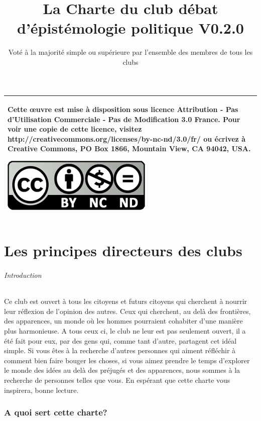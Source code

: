 \documentclass[a4paper,12pt]{article}
\title{\Huge{La Charte du club débat d'épistémologie politique} \LARGE{V0.2.0}}
\author{Voté à la majorité simple ou supérieure par l'ensemble des membres de tous les clubs}
\begin{document}
\maketitle

\begin{tabular}{|p{}|}
 \hline
 Cette œuvre est mise à disposition sous licence Attribution - Pas d’Utilisation Commerciale - Pas de Modification 3.0 France. Pour voir une copie de cette licence, visitez http://creativecommons.org/licenses/by-nc-nd/3.0/fr/ ou écrivez à Creative Commons, PO Box 1866, Mountain View, CA 94042, USA.
 \begin{center}
 \includegraphics[scale=1]{cc.jpg}
 \end{center}\\
 \hline
\end{tabular}
\tableofcontents
\newpage

\part{Les principes directeurs des clubs}
\paragraph{Introduction}
Ce club est ouvert à tous les citoyens et futurs citoyens qui cherchent à nourrir leur réflexion de l'opinion des autres. Ceux qui cherchent, au delà des frontières, des apparences, un monde où les hommes pourraient cohabiter d'une manière plus harmonieuse. A tous ceux ci, le club ne leur est pas seulement ouvert, il a été fait pour eux, par des gens qui, comme tant d'autre, partagent cet idéal simple. Si vous êtes à la recherche d'autres personnes qui aiment réfléchir à comment bien faire bouger les choses, si vous aimez prendre le temps d'explorer le monde des idées au delà des préjugés et des apparences, nous sommes à la recherche de personnes telles que vous. En espérant que cette charte vous inspirera, bonne lecture.

\section{A quoi sert cette charte?}
\end{document}
